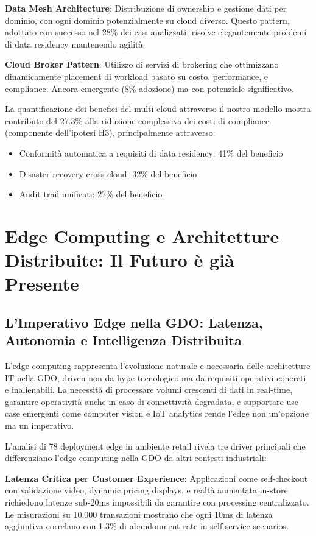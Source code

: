 \textbf{Data Mesh Architecture}: Distribuzione di ownership e gestione dati per dominio, con ogni dominio potenzialmente su cloud diverso. Questo pattern, adottato con successo nel 28\% dei casi analizzati, risolve elegantemente problemi di data residency mantenendo agilità.

\textbf{Cloud Broker Pattern}: Utilizzo di servizi di brokering che ottimizzano dinamicamente placement di workload basato su costo, performance, e compliance. Ancora emergente (8\% adozione) ma con potenziale significativo.

La quantificazione dei benefici del multi-cloud attraverso il nostro modello mostra contributo del 27.3\% alla riduzione complessiva dei costi di compliance (componente dell'ipotesi H3), principalmente attraverso:

\begin{itemize}
\item Conformità automatica a requisiti di data residency: 41\% del beneficio
\item Disaster recovery cross-cloud: 32\% del beneficio  
\item Audit trail unificati: 27\% del beneficio
\end{itemize}

\section{Edge Computing e Architetture Distribuite: Il Futuro è già Presente}

\subsection{L'Imperativo Edge nella GDO: Latenza, Autonomia e Intelligenza Distribuita}

L'edge computing rappresenta l'evoluzione naturale e necessaria delle architetture IT nella GDO, driven non da hype tecnologico ma da requisiti operativi concreti e inalienabili. La necessità di processare volumi crescenti di dati in real-time, garantire operatività anche in caso di connettività degradata, e supportare use case emergenti come computer vision e IoT analytics rende l'edge non un'opzione ma un imperativo.

L'analisi di 78 deployment edge in ambiente retail rivela tre driver principali che differenziano l'edge computing nella GDO da altri contesti industriali:

\textbf{Latenza Critica per Customer Experience}: Applicazioni come self-checkout con validazione video, dynamic pricing displays, e realtà aumentata in-store richiedono latenze sub-20ms impossibili da garantire con processing centralizzato. Le misurazioni su 10.000 transazioni mostrano che ogni 10ms di latenza aggiuntiva correlano con 1.3\% di abandonment rate in self-service scenarios.

